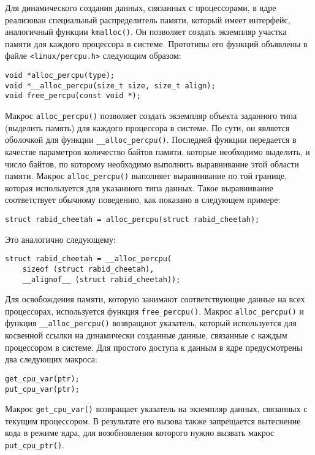 \documentclass[12pt]{article}
\begin{document}
Для динамического создания данных, связанных с процессорами, в ядре реализован
специальный распределитель памяти, который имеет интерфейс, аналогичный функции
\verb!kmalloc()!. Он позволяет создать экземпляр участка памяти для каждого процессора в
системе. Прототипы его функций объявлены в файле \verb!<linux/percpu.h>! следующим
образом:

\begin{lstlisting}
void *alloc_percpu(type);
void *__alloc_percpu(size_t size, size_t align);
void free_percpu(const void *);
\end{lstlisting}

Макрос \verb!alloc_percpu()! позволяет создать экземпляр объекта заданного типа (выделить память) для каждого процессора в системе. По сути, он является оболочкой для
функции \verb!__alloc_percpu()!. Последней функции передается в качестве параметров
количество байтов памяти, которые необходимо выделить, и число байтов, по которому
необходимо выполнить выравнивание этой области памяти. Макрос \verb!alloc_percpu()!
выполняет выравнивание по той границе, которая используется для указанного типа данных. Такое выравнивание соответствует обычному поведению, как показано в следующем примере:

\begin{lstlisting}
struct rabid_cheetah = alloc_percpu(struct rabid_cheetah);
\end{lstlisting}

Это аналогично следующему:

\begin{lstlisting}
struct rabid_cheetah = __alloc_percpu(
    sizeof (struct rabid_cheetah),
    __alignof__ (struct rabid_cheetah));
\end{lstlisting}

Для освобождения памяти, которую занимают соответствующие данные на всех процессорах, используется функция \verb!free_percpu()!.
Макрос \verb!alloc_percpu()! и функция \verb!__alloc_percpu()! возвращают указатель,
который используется для косвенной ссылки на динамически созданные данные, связанные с каждым процессором в системе.
Для простого доступа к данным в ядре предусмотрены два следующих макроса:

\begin{lstlisting}
get_cpu_var(ptr);
put_cpu_var(ptr);
\end{lstlisting}

Макрос \verb!get_cpu_var()! возвращает указатель на экземпляр данных, связанных с текущим процессором.
В результате его вызова также запрещается вытеснение кода в режиме ядра, для возобновления которого нужно вызвать макрос \verb!put_cpu_ptr()!.
\end{document}
